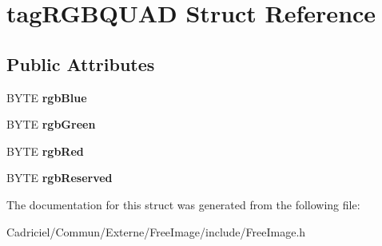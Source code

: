 \hypertarget{structtag_r_g_b_q_u_a_d}{\section{tag\-R\-G\-B\-Q\-U\-A\-D Struct Reference}
\label{structtag_r_g_b_q_u_a_d}
}
\subsection*{Public Attributes}
\begin{DoxyCompactItemize}
\item 
\hypertarget{structtag_r_g_b_q_u_a_d_ad99c50770a73c6fae3ee1ea627da1c60}{B\-Y\-T\-E {\bfseries rgb\-Blue}}\label{structtag_r_g_b_q_u_a_d_ad99c50770a73c6fae3ee1ea627da1c60}

\item 
\hypertarget{structtag_r_g_b_q_u_a_d_a4dae0a7db2f4d432cb4da3de4ef337bd}{B\-Y\-T\-E {\bfseries rgb\-Green}}\label{structtag_r_g_b_q_u_a_d_a4dae0a7db2f4d432cb4da3de4ef337bd}

\item 
\hypertarget{structtag_r_g_b_q_u_a_d_aa143fcd3ff08a04b152bee9d410821a6}{B\-Y\-T\-E {\bfseries rgb\-Red}}\label{structtag_r_g_b_q_u_a_d_aa143fcd3ff08a04b152bee9d410821a6}

\item 
\hypertarget{structtag_r_g_b_q_u_a_d_a2758aec56e37d4f3f5fde511a58f4f82}{B\-Y\-T\-E {\bfseries rgb\-Reserved}}\label{structtag_r_g_b_q_u_a_d_a2758aec56e37d4f3f5fde511a58f4f82}

\end{DoxyCompactItemize}


The documentation for this struct was generated from the following file\-:\begin{DoxyCompactItemize}
\item 
Cadriciel/\-Commun/\-Externe/\-Free\-Image/include/Free\-Image.\-h\end{DoxyCompactItemize}
